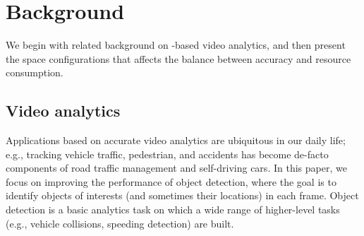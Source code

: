 \section{Background}
We begin with related background on \nn-based video analytics, and 
then present the space \nn configurations that affects the balance
between accuracy and resource consumption.

\subsection{Video analytics}
Applications based on accurate video analytics are ubiquitous in our
daily life; e.g., tracking vehicle traffic, pedestrian, and accidents
has become de-facto components of road traffic management and 
self-driving cars.
In this paper, we focus on improving the performance of object 
detection, where the goal is to identify objects of interests (and
sometimes their locations) in each frame.
Object detection is a basic analytics task on which a wide range of 
higher-level tasks (e.g., vehicle collisions, speeding detection)
are built.

